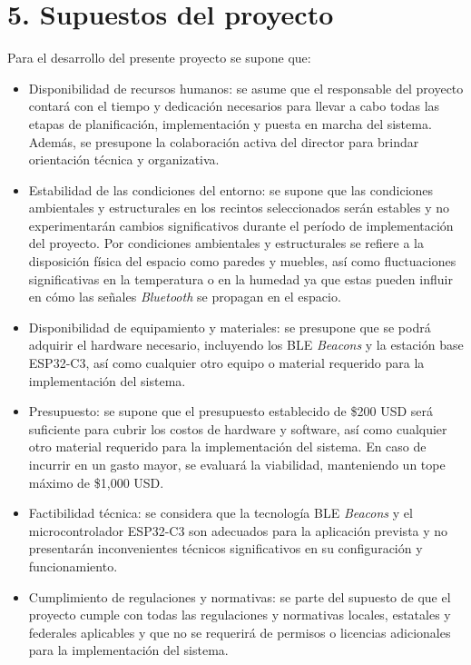 \documentclass[
11pt, %
]{charter}
\begin{document}
\section{5. Supuestos del proyecto}
\label{sec:supuestos}

Para el desarrollo del presente proyecto se supone que:

\begin{itemize}
	\item Disponibilidad de recursos humanos: se asume que el responsable del proyecto contará con el tiempo y dedicación necesarios para llevar a cabo todas las etapas de planificación, implementación y puesta en marcha del sistema. Además, se presupone la colaboración activa del director para brindar orientación técnica y organizativa.
	\item Estabilidad de las condiciones del entorno: se supone que las condiciones ambientales y estructurales en los recintos seleccionados serán estables y no experimentarán cambios significativos durante el período de implementación del proyecto. Por condiciones ambientales y estructurales se refiere a la disposición física del espacio como paredes y muebles, así como fluctuaciones significativas en la temperatura o en la humedad ya que estas pueden influir en cómo las señales \textit{Bluetooth} se propagan en el espacio.
	\item Disponibilidad de equipamiento y materiales: se presupone que se podrá adquirir el hardware necesario, incluyendo los BLE \textit{Beacons} y la estación base ESP32-C3, así como cualquier otro equipo o material requerido para la implementación del sistema.
	\item Presupuesto: se supone que el presupuesto establecido de {\$200} USD será suficiente para cubrir los costos de hardware y software, así como cualquier otro material requerido para la implementación del sistema. En caso de incurrir en un gasto mayor, se evaluará la viabilidad, manteniendo un tope máximo de {\$1,000} USD.
	\item Factibilidad técnica: se considera que la tecnología BLE \textit{Beacons} y el microcontrolador ESP32-C3 son adecuados para la aplicación prevista y no presentarán inconvenientes técnicos significativos en su configuración y funcionamiento.
	\item Cumplimiento de regulaciones y normativas: se parte del supuesto de que el proyecto cumple con todas las regulaciones y normativas locales, estatales y federales aplicables y que no se requerirá de permisos o licencias adicionales para la implementación del sistema.

\end{itemize}
\end{document}
